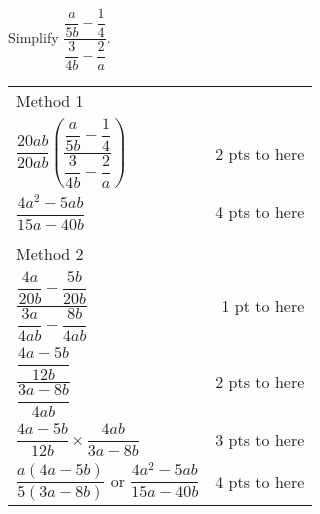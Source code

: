 {
	Simplify $\displaystyle \dfrac{\dfrac{a}{5b}-\dfrac{1}{4}}{\dfrac{3}{4b}-\dfrac{2}{a}}$.
}
{
	\begin{tabular}{l r}
	Method 1 \\
	$\dfrac{20ab}{20ab}\left(\dfrac{\dfrac{a}{5b}-\dfrac{1}{4}}{\dfrac{3}{4b}-\dfrac{2}{a}}\right)$ & 2 pts to here\\
	$\dfrac{4a^2-5ab}{15a-40b}$ & 4 pts to here\\ \\
	Method 2 \\
	$\dfrac{\dfrac{4a}{20b}-\dfrac{5b}{20b}}{\dfrac{3a}{4ab}-\dfrac{8b}{4ab}}$ & 1 pt to here\\
	$\dfrac{\dfrac{4a-5b}{12b}}{\dfrac{3a-8b}{4ab}}$ & 2 pts to here\\
	$\dfrac{4a-5b}{12b} \times \dfrac{4ab}{3a-8b}$ & 3 pts to here\\
	$\dfrac{a(4a-5b)}{5(3a-8b)}$  or $\dfrac{4a^2-5ab}{15a-40b}$ & 4 pts to here
	\end{tabular}
}
